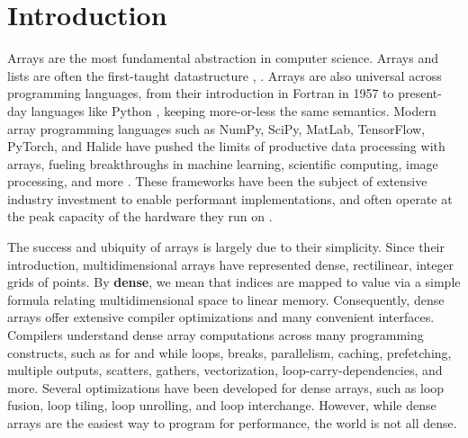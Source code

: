
\section{Introduction}

Arrays are the most fundamental abstraction in computer science. Arrays and lists are often the first-taught datastructure
\cite[Chapter 2.2]{abelson_structure_1996}, \cite[Chapter 2.2]{knuth_art_1997}.
%
Arrays are also universal across programming languages, from their introduction
in Fortran in 1957 to present-day languages like Python
\cite{backus_fortran_1957}, keeping more-or-less the same semantics.
%
Modern
array programming languages such as NumPy, SciPy, MatLab, TensorFlow, PyTorch,
and Halide have pushed the limits of productive data processing with arrays,
fueling breakthroughs in machine learning, scientific computing, image
processing, and more  \cite{harris_array_2020, virtanen_scipy_2020,
moler_history_2020, abadi_tensorflow_2016,
paszke_pytorch_2019,ragan-kelley_halide_2013}.
These frameworks have been the
subject of extensive industry investment to enable performant implementations,
and often operate at the peak capacity of the hardware they run on
\cite{lo_roofline_2015}.

The success and ubiquity of arrays is largely due to their simplicity. 
%
Since their introduction, multidimensional arrays have represented dense, rectilinear,
integer grids of points. 
%
By \textbf{dense}, we mean that indices are mapped to value via a simple formula relating multidimensional space to linear memory.
%
Consequently, dense arrays offer extensive compiler optimizations and many convenient interfaces.
%
%
Compilers understand dense array computations across many
programming constructs, such as for and while loops, breaks, parallelism,
caching, prefetching, multiple outputs, scatters, gathers, vectorization,
loop-carry-dependencies, and more. Several optimizations have been developed for
dense arrays, such as loop fusion, loop tiling, loop unrolling, and loop
interchange.
%
However, while dense arrays are the easiest way to program for performance, the world is not all dense.


